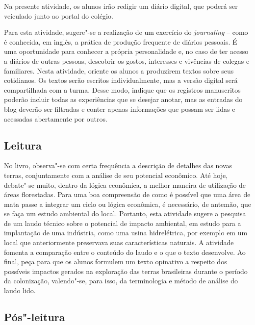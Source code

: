 \documentclass[12pt]{extarticle}
\begin{document}
Na presente atividade, os alunos irão redigir um diário digital, que
poderá ser veiculado junto ao portal do colégio.

Para esta atividade, sugere"-se a realização de um exercício do
\emph{journaling} -- como é conhecida, em inglês, a prática de produção
frequente de diários pessoais. É uma oportunidade para conhecer a
própria personalidade e, no caso de ter acesso a diários de outras
pessoas, descobrir os gostos, interesses e vivências de colegas e
familiares. Nesta atividade, oriente os alunos a produzirem textos sobre
seus cotidianos. Os textos serão escritos individualmente, mas a versão
digital será compartilhada com a turma. Desse modo, indique que os
registros manuscritos poderão incluir todas as experiências que se
desejar anotar, mas as entradas do blog deverão ser filtradas e conter
apenas informações que possam ser lidas e acessadas abertamente por
outros.

\subsection{Leitura}


No livro, observa"-se com certa frequência a descrição de detalhes das
novas terras, conjuntamente com a análise de seu potencial econômico.
Até hoje, debate"-se muito, dentro da lógica econômica, a melhor maneira
de utilização de áreas florestadas. Para uma boa compreensão de como é
possível que uma área de mata passe a integrar um ciclo ou lógica
econômica, é necessário, de antemão, que se faça um estudo ambiental do
local. Portanto, esta atividade sugere a pesquisa de um laudo técnico
sobre o potencial de impacto ambiental, em estudo para a implantação de
uma indústria, como uma usina hidrelétrica, por exemplo em um local que
anteriormente preservava suas características naturais. A atividade
fomenta a comparação entre o conteúdo do laudo e o que o texto
desenvolve. Ao final, peça para que os alunos formulem um texto
opinativo a respeito dos possíveis impactos gerados na exploração das
terras brasileiras durante o período da colonização, valendo"-se, para
isso, da terminologia e método de análise do laudo lido.

\subsection{Pós"-leitura}

\end{document}
